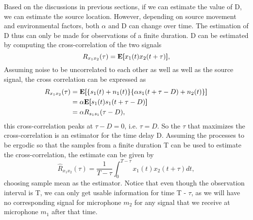 Based on the discussions in previous sections, if we can estimate the value of D, we can estimate the source location. However, depending on source movement and environmental factors, both $\alpha$ and D can change over time. The estimation of D thus can only be made for observations of a finite duration. D can be estimated by computing the cross-correlation of the two signals
\begin{equation}
        R_{x_1x_2}(\tau) = \textbf{E[}x_1(t)x_2(t+\tau)\textbf], 
\end{equation}
Assuming noise to be uncorrelated to each other as well as well as the source signal, the cross correlation can be expressed as
\begin{equation}
    \begin{split}
        R_{x_1x_2}(\tau) &= \textbf{E[}\{s_1(t) + n_1(t)\}\{\alpha s_1(t+\tau - D) + n_2(t)\}\textbf] \\
                         &= \alpha\textbf{E[}s_1(t)s_1(t+\tau - D)\textbf] \\
                         &= \alpha R_{s_1s_1}(\tau - D),
    \end{split}
    \label{Eq:crosscorr}
\end{equation}
this cross-correlation peaks at $\tau - D = 0$, i.e. $\tau = D$. So the $\tau$ that maximizes the cross-correlation is an estimator for the time delay D. Assuming the processes to be ergodic so that the samples from a finite duration T can be used to estimate the cross-correlation, the estimate can be given by
\begin{equation}
    \hat{R}_{x_1 x_2}(\tau) = \frac{1}{T-\tau}\int_{0}^{T-\tau}x_1(t)x_2(t+\tau)dt,
\end{equation}
choosing sample mean as the estimator. Notice that even though the observation interval is T, we can only get usable information for time T - $\tau$, as we will have no corresponding signal for microphone $m_2$ for any signal that we receive at microphone $m_1$ after that time.

